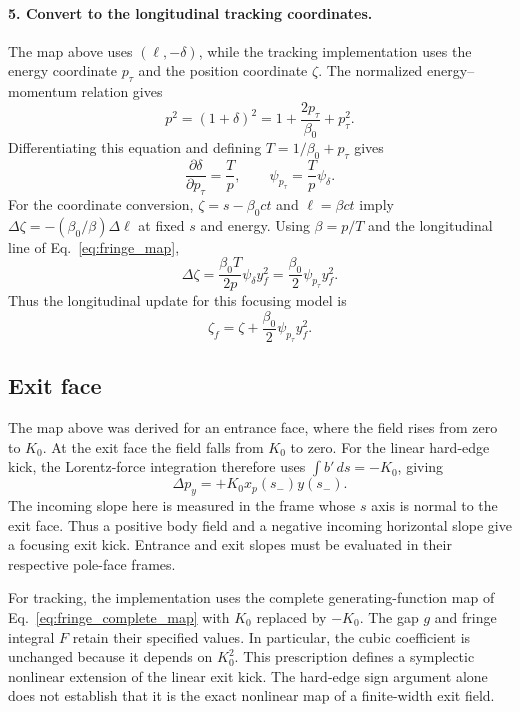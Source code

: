 \paragraph{5. Convert to the longitudinal tracking coordinates.}
The map above uses $(\ell,-\delta)$, while the tracking implementation
uses the energy coordinate $p_\tau$ and the position coordinate $\zeta$.
The normalized energy--momentum relation gives
\begin{equation}
 p^2=(1+\delta)^2=1+\frac{2p_\tau}{\beta_0}+p_\tau^2.
\end{equation}
Differentiating this equation and defining $T=1/\beta_0+p_\tau$ gives
\begin{equation}
 \frac{\partial\delta}{\partial p_\tau}=\frac{T}{p},\qquad
 \psi_{p_\tau}=\frac{T}{p}\psi_\delta.
\end{equation}
For the coordinate conversion, $\zeta=s-\beta_0ct$ and $\ell=\beta ct$
imply $\Delta\zeta=-(\beta_0/\beta)\Delta\ell$ at fixed $s$ and energy.
Using $\beta=p/T$ and the longitudinal line of Eq.~\eqref{eq:fringe_map},
\begin{equation}
 \Delta\zeta=\frac{\beta_0T}{2p}\psi_\delta y_f^2
             =\frac{\beta_0}{2}\psi_{p_\tau}y_f^2.
\end{equation}
Thus the longitudinal update for this focusing model is
\begin{equation}
 \zeta_f=\zeta+\frac{\beta_0}{2}\psi_{p_\tau}y_f^2.
\end{equation}

\subsection{Exit face}
\label{sec:fringe_exit_face}

The map above was derived for an entrance face, where the field rises from
zero to $K_0$. At the exit face the field falls from $K_0$ to zero.
For the linear hard-edge kick, the Lorentz-force integration therefore
uses $\int b'\,ds=-K_0$, giving
\begin{equation}
 \Delta p_y=+K_0x_p(s_-)y(s_-).
\end{equation}
The incoming slope here is measured in the frame whose $s$ axis is normal
to the exit face. Thus a positive body field and a negative incoming
horizontal slope give a focusing exit kick. Entrance and exit slopes must
be evaluated in their respective pole-face frames.

For tracking, the implementation uses the complete generating-function
map of Eq.~\eqref{eq:fringe_complete_map} with $K_0$ replaced by $-K_0$.
The gap $g$ and fringe integral $F$ retain their specified values. In
particular, the cubic coefficient is unchanged because it depends on
$K_0^2$. This prescription defines a symplectic nonlinear extension of the
linear exit kick. The hard-edge sign argument alone does not establish
that it is the exact nonlinear map of a finite-width exit field.

